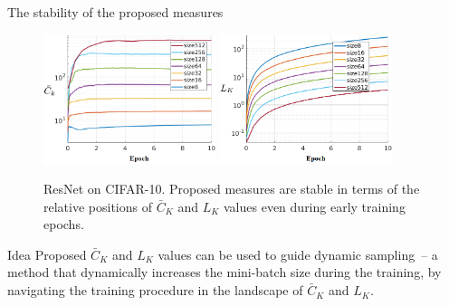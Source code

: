 \documentclass{beamer}
\begin{document}
\begin{frame}{The stability of the proposed measures}
    \begin{figure}
        \centering
        \includegraphics[width=0.45\textwidth]{figs/fig_batch_size_AVG_C_K_10epochs.png}
        \includegraphics[width=0.45\textwidth]{figs/fig_batch_size_L_K_10epochs.png}
        \caption{ResNet on CIFAR-10. Proposed measures are stable in terms of the relative positions of $\bar{C}_K$ and $L_K$ values even during early training epochs.}
        \label{fig:batch-lr}
    \end{figure}
    \vspace{-0.5cm}
    \begin{alertblock}{Idea}
        Proposed $\bar{C}_K$ and $L_K$ values can be used to guide dynamic sampling~-- a method that dynamically increases the mini-batch size during the training, by navigating the training procedure in the landscape of $\bar{C}_K$ and $L_K$.
    \end{alertblock}
\end{frame}
\end{document}

